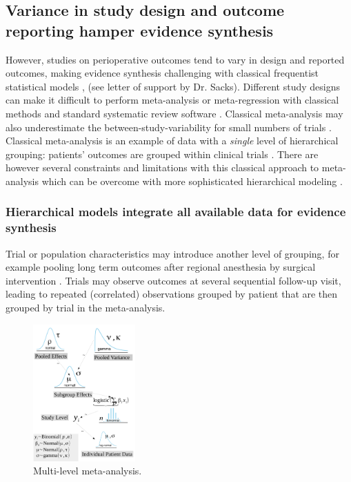 \documentclass[11pt,notitlepage]{article}
\begin{document}
\subsection*{Variance in study design and outcome reporting hamper evidence synthesis}
However, studies on perioperative outcomes tend to vary in design and reported outcomes\cite{Andreae2013}, making 
evidence synthesis challenging with classical frequentist statistical models \cite{Spiegelhalter_11134920}, (see 
letter of support by Dr. Sacks). Different study designs can make it difficult to perform meta-analysis or meta-regression 
with classical methods and standard systematic review software \cite{Deeks2011chapter}. Classical meta-analysis may also 
underestimate the between-study-variability for small numbers of trials \cite{Song2012,Cornell2014,Andreae2015}. 
Classical meta-analysis is an example of data with a \textit{single} level of hierarchical grouping: patients' 
outcomes are grouped within clinical trials \cite{egger2008systematic}. There are however several constraints and limitations 
with this classical approach to meta-analysis which can be overcome with more sophisticated hierarchical modeling  
\cite{Andreae2015,Thompson2002,Abroug2011}.

\subsubsection*{Hierarchical models integrate all available data for evidence synthesis}



Trial or population characteristics may introduce another level of grouping, for example pooling long term outcomes 
after regional anesthesia by surgical intervention \cite{Andreae2013,Abroug2011}. Trials may observe outcomes at several 
sequential follow-up visit, leading to repeated (correlated) observations grouped by patient that are then grouped by trial 
in the meta-analysis.  

\begin{figure} 
\includegraphics[width=0.35\textwidth]{Figures/DistrogramMultiLevelMetaAnalysis.pdf} 
\caption{Multi-level meta-analysis.}
\label{fig:MetaAnalysis}
\end{figure}
\end{document}
